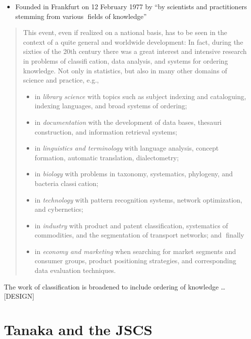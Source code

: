 \documentclass[
  letterpaper,
]{report}
\providecommand{\tightlist}{%
  \setlength{\itemsep}{0pt}\setlength{\parskip}{0pt}}\usepackage{longtable,booktabs,array}
\begin{document}
\begin{itemize}
\tightlist
\item
  Founded in Frankfurt on 12 February 1977 by ``by scientists and
  practitioners stemming from various fields of knowledge''
\end{itemize}

\begin{quote}
This event, even if realized on a national basis, has to be seen in the
context of a quite general and worldwide development: In fact, during
the sixties of the 20th century there was a great interest and intensive
research in problems of classification, data analysis, and systems for
ordering knowledge. Not only in statistics, but also in many other
domains of science and practice, e.g., 

\begin{itemize}
\tightlist
\item
  in \emph{library science} with topics such as subject indexing and
  cataloguing, indexing languages, and broad systems of ordering; 
\item
  in \emph{documentation} with the development of data bases, thesauri
  construction, and information retrieval systems; 
\item
  in \emph{linguistics and terminology} with language analysis, concept
  formation, automatic translation, dialectometry; 
\item
  in \emph{biology} with problems in taxonomy, systematics, phylogeny,
  and bacteria classication; 
\item
  in \emph{technology} with pattern recognition systems, network
  optimization, and cybernetics; 
\item
  in \emph{industry} with product and patent classification, systematics
  of commodities, and the segmentation of transport networks; and
  finally 
\item
  in \emph{economy and marketing} when searching for market segments and
  consumer groups, product positioning strategies, and corresponding
  data evaluation techniques.
\end{itemize}
\end{quote}

The work of classification is broadened to include ordering of knowledge
\ldots{} {[}DESIGN{]}

\hypertarget{tanaka-and-the-jscs}{%
\section{Tanaka and the JSCS}\label{tanaka-and-the-jscs}}
\end{document}
